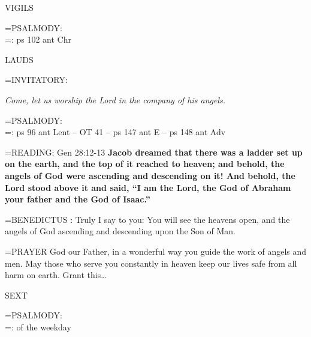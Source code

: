\begin{flushleft}\normalsize VIGILS\\\end{flushleft}

\hangindent=\parindent \small{PSALMODY:}\\
\hangindent=\parindent : ps 102 ant Chr\vspace{0.5em}

\begin{flushleft}\normalsize LAUDS\\\end{flushleft}

\hangindent=\parindent \small{INVITATORY:}
\begin{center}
\textit{Come, let us worship the Lord in the company of his angels.\\}
\end{center}

\hangindent=\parindent \small{PSALMODY:}\\
\hangindent=\parindent : ps 96 ant Lent -- OT 41 -- ps 147 ant E -- ps 148 ant Adv\vspace{0.5em}

\hangindent=\parindent \small{READING}: Gen 28:12-13 \textbf{Jacob dreamed that there was a ladder set up on
the earth, and the top of it reached to heaven; and behold, the angels
of God were ascending and descending on it! And behold, the Lord
stood above it and said, “I am the Lord, the God of Abraham your
father and the God of Isaac.”\\}
 
\hangindent=\parindent \small{BENEDICTUS : Truly I say to you: You will see the heavens open, and the
angels of God ascending and descending upon the Son of Man.\\}
 
\hangindent=\parindent \small{PRAYER  God our Father, in a wonderful way you guide the work of
angels and men. May those who serve you constantly in heaven keep
our lives safe from all harm on earth. Grant this…\\}
 
\begin{flushleft}\normalsize SEXT\\\end{flushleft}

\hangindent=\parindent \small{PSALMODY:}\\
\hangindent=\parindent : of the weekday\vspace{0.5em}

